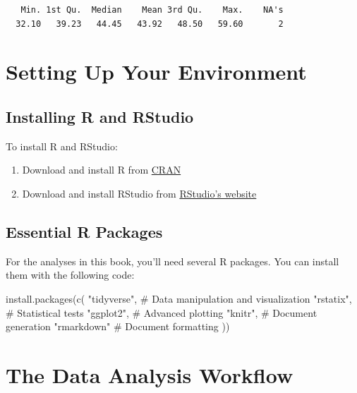 \documentclass[
  letterpaper,
]{book}
\newenvironment{Shaded}{\begin{snugshade}}{\end{snugshade}}
\newcommand{\CommentTok}[1]{\textcolor[rgb]{0.37,0.37,0.37}{#1}}
\newcommand{\FunctionTok}[1]{\textcolor[rgb]{0.28,0.35,0.67}{#1}}
\newcommand{\NormalTok}[1]{\textcolor[rgb]{0.00,0.23,0.31}{#1}}
\newcommand{\StringTok}[1]{\textcolor[rgb]{0.13,0.47,0.30}{#1}}
\providecommand{\tightlist}{%
  \setlength{\itemsep}{0pt}\setlength{\parskip}{0pt}}
\begin{document}
\begin{verbatim}
   Min. 1st Qu.  Median    Mean 3rd Qu.    Max.    NA's 
  32.10   39.23   44.45   43.92   48.50   59.60       2 
\end{verbatim}

\section{Setting Up Your Environment}\label{setting-up-your-environment}

\subsection{Installing R and RStudio}\label{installing-r-and-rstudio}

To install R and RStudio:

\begin{enumerate}
\def\labelenumi{\arabic{enumi}.}
\tightlist
\item
  Download and install R from \href{https://cran.r-project.org/}{CRAN}
\item
  Download and install RStudio from
  \href{https://www.rstudio.com/products/rstudio/download/}{RStudio's
  website}
\end{enumerate}

\subsection{Essential R Packages}\label{essential-r-packages}

For the analyses in this book, you'll need several R packages. You can
install them with the following code:

\begin{Shaded}
\begin{Highlighting}[]
\FunctionTok{install.packages}\NormalTok{(}\FunctionTok{c}\NormalTok{(}
  \StringTok{"tidyverse"}\NormalTok{,  }\CommentTok{\# Data manipulation and visualization}
  \StringTok{"rstatix"}\NormalTok{,    }\CommentTok{\# Statistical tests}
  \StringTok{"ggplot2"}\NormalTok{,    }\CommentTok{\# Advanced plotting}
  \StringTok{"knitr"}\NormalTok{,      }\CommentTok{\# Document generation}
  \StringTok{"rmarkdown"}   \CommentTok{\# Document formatting}
\NormalTok{))}
\end{Highlighting}
\end{Shaded}

\section{The Data Analysis Workflow}\label{the-data-analysis-workflow}
\end{document}
